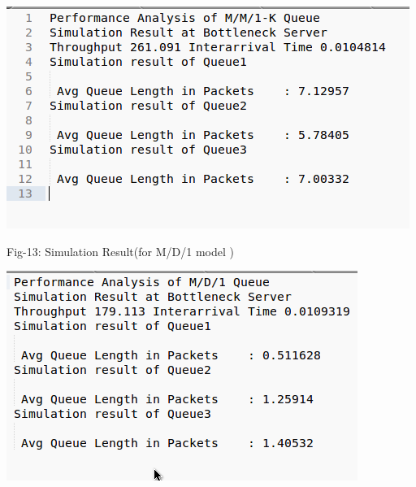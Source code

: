 \documentclass[a4paper,12pt]{report}
\begin{document}
\begin{center}
 \includegraphics[width=12 cm,height=12 cm]{./result1.png}
\end{center}
\noindent Fig-13: Simulation Result(for M/D/1 model )\\
\begin{center}
 \includegraphics[width=12 cm,height=12 cm]{./result2.png}
\end{center}
\end{document}
